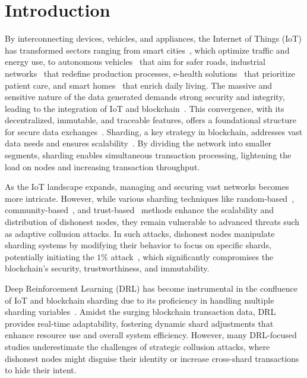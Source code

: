 \section{Introduction}
By interconnecting devices, vehicles, and appliances, 
the Internet of Things (IoT) has transformed sectors ranging from smart cities~\cite{qian2019internet}, which optimize traffic and energy use, to autonomous vehicles~\cite{kang2018blockchain} that aim for safer roads, industrial networks~\cite{singh2020deep} that redefine production processes, e-health solutions~\cite{gadekallu2021blockchain} that prioritize patient care, and smart homes~\cite{park2017comprehensive} that enrich daily living. The massive and sensitive nature of the data generated demands strong security and integrity, leading to the integration of IoT and blockchain~\cite{wang2023blockchain, iot-bc-1, iot-bc-2, 8989788, wang2019survey}. This convergence, with its decentralized, immutable, and traceable features, offers a foundational structure for secure data exchanges~\cite{mathur2023survey}. Sharding, a key strategy in blockchain, addresses vast data needs and ensures scalability~\cite{yu2020survey}. By dividing the network into smaller segments, sharding enables simultaneous transaction processing, lightening the load on nodes and increasing transaction throughput.

As the IoT landscape expands, managing and securing vast networks becomes more intricate. However, while various sharding techniques like random-based~\cite{luu2016secure, kokoris2018omniledger, zamani2018rapidchain, wang2019monoxide}, community-based~\cite{zhang2022community}, and trust-based~\cite{yun2019trust} methods enhance the scalability and distribution of dishonest nodes, they remain vulnerable to advanced threats such as adaptive collusion attacks. In such attacks, dishonest nodes manipulate sharding systems by modifying their behavior to focus on specific shards, potentially initiating the $1\%$ attack~\cite{aponte202151}, which significantly compromises the blockchain's security, trustworthiness, and immutability.

Deep Reinforcement Learning (DRL) has become instrumental in the confluence of IoT and blockchain sharding due to its proficiency in handling multiple sharding variables~\cite{yun2020dqn, yang2022sharded,liu2019performance, liu2018blockchain, qiu2019service, qiu2018blockchain}. Amidst the surging blockchain transaction data, DRL provides real-time adaptability, fostering dynamic shard adjustments that enhance resource use and overall system efficiency. However, many DRL-focused studies underestimate the challenges of strategic collusion attacks, where dishonest nodes might disguise their identity or increase cross-shard transactions to hide their intent.

